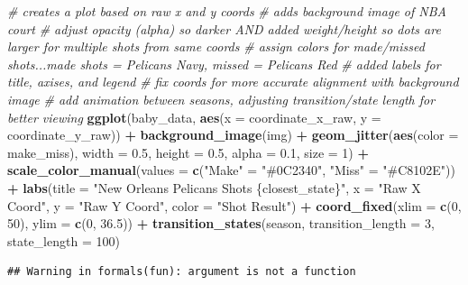 \documentclass[
]{article}
\newenvironment{Shaded}{\begin{snugshade}}{\end{snugshade}}
\newcommand{\AttributeTok}[1]{\textcolor[rgb]{0.13,0.29,0.53}{#1}}
\newcommand{\CommentTok}[1]{\textcolor[rgb]{0.56,0.35,0.01}{\textit{#1}}}
\newcommand{\DecValTok}[1]{\textcolor[rgb]{0.00,0.00,0.81}{#1}}
\newcommand{\FloatTok}[1]{\textcolor[rgb]{0.00,0.00,0.81}{#1}}
\newcommand{\FunctionTok}[1]{\textcolor[rgb]{0.13,0.29,0.53}{\textbf{#1}}}
\newcommand{\NormalTok}[1]{#1}
\newcommand{\OtherTok}[1]{\textcolor[rgb]{0.56,0.35,0.01}{#1}}
\newcommand{\SpecialCharTok}[1]{\textcolor[rgb]{0.81,0.36,0.00}{\textbf{#1}}}
\newcommand{\StringTok}[1]{\textcolor[rgb]{0.31,0.60,0.02}{#1}}
\begin{document}
\begin{Shaded}
\begin{Highlighting}[]
\CommentTok{\# creates a plot based on raw x and y coords}
\CommentTok{\# adds background image of NBA court}
\CommentTok{\# adjust opacity (alpha) so darker AND added weight/height so dots are larger for multiple shots from same coords}
\CommentTok{\# assign colors for made/missed shots...made shots = Pelicans Navy, missed = Pelicans Red}
\CommentTok{\# added labels for title, axises, and legend}
\CommentTok{\# fix coords for more accurate alignment with background image}
\CommentTok{\# add animation between seasons, adjusting transition/state length for better viewing}
\FunctionTok{ggplot}\NormalTok{(baby\_data, }\FunctionTok{aes}\NormalTok{(}\AttributeTok{x =}\NormalTok{ coordinate\_x\_raw, }\AttributeTok{y =}\NormalTok{ coordinate\_y\_raw)) }\SpecialCharTok{+} 
  \FunctionTok{background\_image}\NormalTok{(img) }\SpecialCharTok{+} 
  \FunctionTok{geom\_jitter}\NormalTok{(}\FunctionTok{aes}\NormalTok{(}\AttributeTok{color =}\NormalTok{ make\_miss), }\AttributeTok{width =} \FloatTok{0.5}\NormalTok{, }\AttributeTok{height =} \FloatTok{0.5}\NormalTok{, }\AttributeTok{alpha =} \FloatTok{0.1}\NormalTok{, }\AttributeTok{size =} \DecValTok{1}\NormalTok{) }\SpecialCharTok{+} 
  \FunctionTok{scale\_color\_manual}\NormalTok{(}\AttributeTok{values =} \FunctionTok{c}\NormalTok{(}\StringTok{"Make"} \OtherTok{=} \StringTok{"\#0C2340"}\NormalTok{, }\StringTok{"Miss"} \OtherTok{=} \StringTok{"\#C8102E"}\NormalTok{)) }\SpecialCharTok{+} 
  \FunctionTok{labs}\NormalTok{(}\AttributeTok{title =} \StringTok{"New Orleans Pelicans Shots \{closest\_state\}"}\NormalTok{, }\AttributeTok{x =} \StringTok{"Raw X Coord"}\NormalTok{, }\AttributeTok{y =} \StringTok{"Raw Y Coord"}\NormalTok{, }\AttributeTok{color =} \StringTok{"Shot Result"}\NormalTok{) }\SpecialCharTok{+} 
  \FunctionTok{coord\_fixed}\NormalTok{(}\AttributeTok{xlim =} \FunctionTok{c}\NormalTok{(}\DecValTok{0}\NormalTok{, }\DecValTok{50}\NormalTok{), }\AttributeTok{ylim =} \FunctionTok{c}\NormalTok{(}\DecValTok{0}\NormalTok{, }\FloatTok{36.5}\NormalTok{)) }\SpecialCharTok{+} 
  \FunctionTok{transition\_states}\NormalTok{(season, }\AttributeTok{transition\_length =} \DecValTok{3}\NormalTok{, }\AttributeTok{state\_length =} \DecValTok{100}\NormalTok{)}
\end{Highlighting}
\end{Shaded}

\begin{verbatim}
## Warning in formals(fun): argument is not a function
\end{verbatim}
\end{document}
